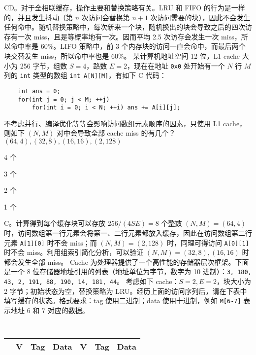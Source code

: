 \begin{problems}
\begin{choices}
        \end{choices}
        \sol CD。对于全相联缓存，操作主要和替换策略有关。LRU 和 FIFO 的行为是一样的，并且发生抖动（第 $n$ 次访问会替换第 $n+1$ 次访问需要的块），因此不会发生任何命中。随机替换策略中，每次新来一个块，随机换出的块会导致之后的四次访存有一次 miss，且是等概率地有一次。因而平均 2.5 次访存会发生一次 miss，所以命中率是 60\%。LIFO 策略中，前 3 个内存块的访问一直会命中，而最后两个块交替发生 miss，所以命中率也是 60\%。
         某计算机地址空间 12 位，L1 cache 大小为 256 字节，组数 $S=4$，路数 $E=2$，现在在地址 \verb|0x0| 处开始有一个 $N$ 行 $M$ 列的 \verb|int| 类型的数组 \verb|int A[N][M]|，有如下 C 代码：
        \begin{verbatim}
    int ans = 0;
    for(int j = 0; j < M; ++j)
        for(int i = 0; i < N; ++i) ans += A[i][j];
        \end{verbatim}
        不考虑并行、编译优化等等会影响访问数组元素顺序的因素，只使用 L1 cache，则如下 $(N, M)$ 对中会导致全部 cache miss 的有几个？$(64, 4), (32, 8), (16, 16), (2, 128)$
        \begin{choices}
            \item 4 个
            \item 3 个
            \item 2 个
            \item 1 个
        \end{choices}
        \sol C。计算得到每个缓存块可以存放 $256/(4SE)=8$ 个整数 $(N, M)=(64, 4)$ 时，访问数组第一行元素会将第一、二行元素都放入缓存，因此在访问数组第二行元素 \verb|A[1][0]| 时不会 miss；而 $(N, M)=(2, 128)$ 时，同理可得访问 \verb|A[0][1]| 时不会 miss。利用组索引简化分析，可以验证 $(N, M)=(32, 8), (16, 16)$ 时都会发生全部 miss。
         Cache 为处理器提供了一个高性能的存储器层次框架。下面是一个 8 位存储器地址引用的列表（地址单位为字节，数字为 10 进制）：\texttt{3, 180, 43, 2, 191, 88, 190, 14, 181, 44}。
        \qn 考虑如下 cache：$S=2, E=2$，块大小为 2 字节；初始状态为空，替换策略为 LRU。经历上面的访问序列后，请在下表中填写缓存的状态。格式要求：tag 使用二进制；data 使用十进制，例如 \verb|M[6-7]| 表示地址 6 和 7 对应的数据。
        \begin{table}[H]
            \tt
            \centering
            \begin{tabular}{|c|c|c|c|c|c|c|}
                \hline
                & {\quad V \quad} & {\quad Tag \quad} & {\quad Data \quad} & {\quad V \quad} & {\quad Tag \quad} & {\quad Data \quad} \\ \hline

\end{tabular}
\end{table}
\end{problems}
